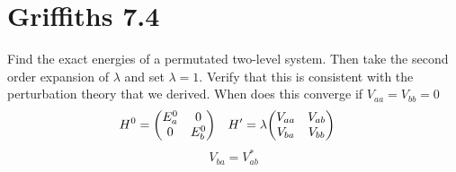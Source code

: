 \documentclass[11pt]{article}
\begin{document}
\newpage 

\section*{Griffiths 7.4}
Find the exact energies of a permutated two-level system. Then take the second order expansion of $\lambda$ and set $\lambda=1$. Verify that this is consistent with the perturbation theory that we derived. When does this converge if $V_{aa} = V_{bb} = 0$
\begin{align*}
H^0 & = \mqty(E^0_a & 0 \\ 0  & E^0_b) & H^\prime & =  \lambda \mqty(V_{aa} & V_{ab} \\ V_{ba} & V_{bb})
\end{align*}
\[V_{ba} = V_{ab}^*\]
\end{document}
